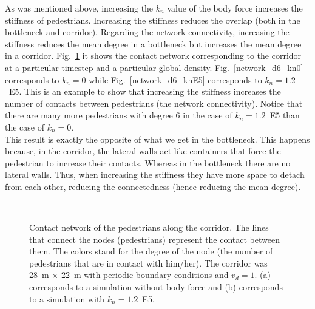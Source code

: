 \documentclass[preprint,12pt]{elsarticle}
\begin{document}
As was mentioned above, increasing the $k_n$ value of the body force increases the stiffness of pedestrians. Increasing the stiffness reduces the overlap (both in the bottleneck and corridor). Regarding the network connectivity, increasing the stiffness reduces the mean degree in a bottleneck but increases the mean degree in a corridor. Fig.~\ref{network_corridor} it shows the contact network corresponding to the corridor at a particular timestep and a particular global density. Fig.~\ref{network_d6_kn0} corresponds to $k_n=0$ while Fig.~\ref{network_d6_knE5} corresponds to $k_n=1.2$~E5. This is an example to show that increasing the stiffness increases the number of contacts between pedestrians (the network connectivity). Notice that there are many more pedestrians with degree 6 in the case of $k_n=1.2$~E5 than the case of $k_n=0$. \\

This result is exactly the opposite of what we get in the bottleneck. This happens because, in the corridor, the lateral walls act like containers that force the pedestrian to increase their contacts. Whereas in the bottleneck there are no lateral walls. Thus, when increasing the stiffness they have more space to detach from each other, reducing the connectedness (hence reducing the mean degree). \\

\begin{figure}[!htbp]
\centering
    \ 
    \\
\caption[width=0.47\columnwidth]{Contact network of the pedestrians along the corridor. The lines that connect the nodes (pedestrians) represent the contact between them. The colors stand for the degree of the node (the number of pedestrians that are in contact with him/her). The corridor was 28~m $\times$ 22~m with periodic boundary conditions and $v_d=1$. (a) corresponds to a simulation without body force and (b) corresponds to a simulation with $k_n=1.2$~E5.}
\label{network_corridor}
\end{figure}
\end{document}
